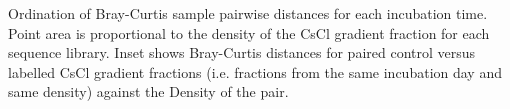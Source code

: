 Ordination of Bray-Curtis sample pairwise distances for each incubation time. Point area is proportional to the density of the CsCl gradient fraction for each sequence library. Inset shows Bray-Curtis distances for paired control versus labelled CsCl gradient fractions (i.e. fractions from the same incubation day and same density) against the Density of the pair. 